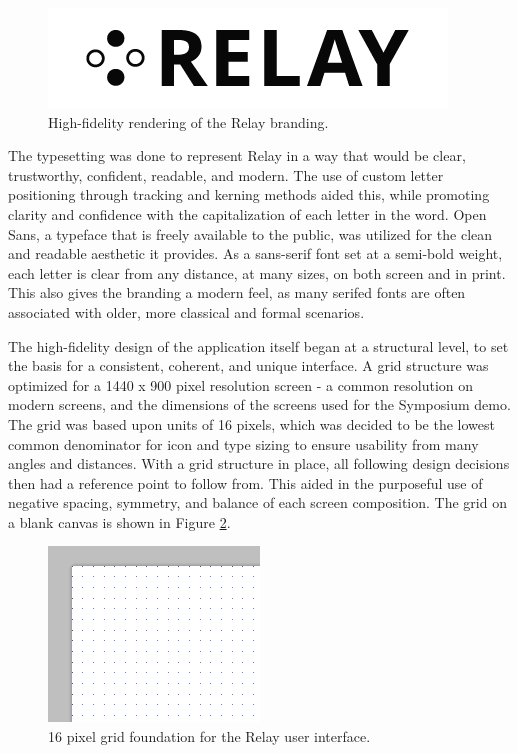 \documentclass{report}
\begin{document}
\begin{figure}[htbp!]
  \begin{centering}
    \includegraphics[scale=0.7]{figures/relay-logo.png}
    \caption{High-fidelity rendering of the Relay branding.}
    \label{fig:relay-logo}
  \end{centering}
\end{figure}

The typesetting was done to represent Relay in a way that would be clear, trustworthy, confident, readable, and modern.
The use of custom letter positioning through tracking and kerning methods aided this, while promoting clarity and confidence with the capitalization of each letter in the word.
Open Sans, a typeface that is freely available to the public, was utilized for the clean and readable aesthetic it provides.
As a sans-serif font set at a semi-bold weight, each letter is clear from any distance, at many sizes, on both screen and in print.
This also gives the branding a modern feel, as many serifed fonts are often associated with older, more classical and formal scenarios.

The high-fidelity design of the application itself began at a structural level, to set the basis for a consistent, coherent, and unique interface.
A grid structure was optimized for a 1440 x 900 pixel resolution screen - a common resolution on modern screens, and the dimensions of the screens used for the Symposium demo.
The grid was based upon units of 16 pixels, which was decided to be the lowest common denominator for icon and type sizing to ensure usability from many angles and distances.
With a grid structure in place, all following design decisions then had a reference point to follow from.
This aided in the purposeful use of negative spacing, symmetry, and balance of each screen composition.
The grid on a blank canvas is shown in Figure \ref{fig:dot-grid}. \\

\begin{figure}[htbp!]
  \begin{centering}
    \includegraphics[scale=1]{figures/dot-grid.png}
    \caption{16 pixel grid foundation for the Relay user interface.}
    \label{fig:dot-grid}
  \end{centering}
\end{figure}
\end{document}
